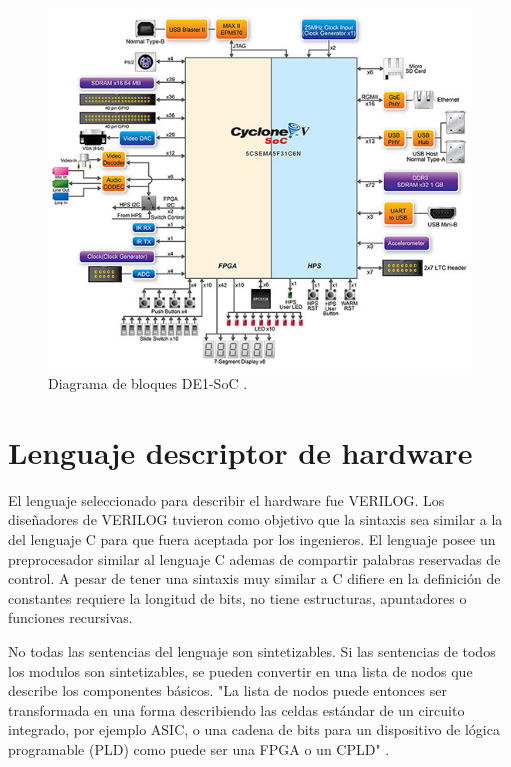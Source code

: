 \begin{figure}[htpb]
	\centering
	\includegraphics[scale=0.4]{Figures/fpgablock.jpg}  
	\caption{Diagrama de bloques DE1-SoC \protect\footnotemark.}
	\label{fig:DE1BLOCK}
\end{figure}



\section{Lenguaje descriptor de hardware}


El lenguaje seleccionado para describir el hardware fue VERILOG. Los diseñadores de VERILOG tuvieron como objetivo que la sintaxis sea similar a la del lenguaje C para que fuera aceptada por los ingenieros. El lenguaje posee un preprocesador similar al lenguaje C ademas de compartir palabras reservadas de control. A pesar de tener una sintaxis muy similar a C difiere en la definición de constantes requiere la longitud de bits, no tiene estructuras, apuntadores o funciones recursivas. 

No todas las sentencias del lenguaje son sintetizables. Si las sentencias de todos los modulos son sintetizables, se pueden convertir en una lista de nodos que describe los componentes básicos. "La lista de nodos puede entonces ser transformada en una forma describiendo las celdas estándar de un circuito integrado, por ejemplo ASIC, o una cadena de bits para un dispositivo de lógica programable (PLD) como puede ser una FPGA o un CPLD"  \citep{WIKIVERILOG}.




